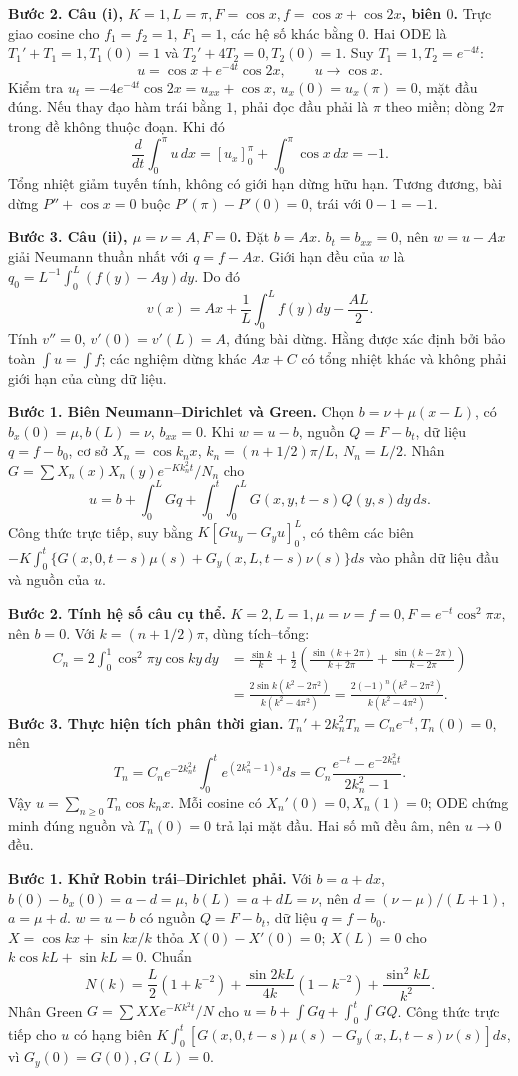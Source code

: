 \textbf{Bước 2. Câu (i), $K=1,L=\pi,F=\cos x,f=\cos x+\cos2x$, biên $0$.}
Trực giao cosine cho $f_1=f_2=1$, $F_1=1$, các hệ số khác bằng $0$. Hai ODE là $T_1'+T_1=1,T_1(0)=1$ và $T_2'+4T_2=0,T_2(0)=1$. Suy $T_1=1,T_2=e^{-4t}$:
\[u=\cos x+e^{-4t}\cos2x,\qquad u\to\cos x.\]
Kiểm tra $u_t=-4e^{-4t}\cos2x=u_{xx}+\cos x$, $u_x(0)=u_x(\pi)=0$, mặt đầu đúng.
Nếu thay đạo hàm trái bằng $1$, phải đọc đầu phải là $\pi$ theo miền; dòng $2\pi$ trong đề không thuộc đoạn. Khi đó
\[\frac d{dt}\int_0^\pi u\,dx=[u_x]_0^\pi+\int_0^\pi\cos x\,dx=-1.\]
Tổng nhiệt giảm tuyến tính, không có giới hạn dừng hữu hạn. Tương đương, bài dừng $P''+\cos x=0$ buộc $P'(\pi)-P'(0)=0$, trái với $0-1=-1$.

\textbf{Bước 3. Câu (ii), $\mu=\nu=A,F=0$.}
Đặt $b=Ax$. $b_t=b_{xx}=0$, nên $w=u-Ax$ giải Neumann thuần nhất với $q=f-Ax$. Giới hạn đều của $w$ là $q_0=L^{-1}\int_0^L(f(y)-Ay)dy$. Do đó
\[v(x)=Ax+\frac1L\int_0^Lf(y)dy-\frac{AL}2.\]
Tính $v''=0$, $v'(0)=v'(L)=A$, đúng bài dừng. Hằng được xác định bởi bảo toàn $\int u=\int f$; các nghiệm dừng khác $Ax+C$ có tổng nhiệt khác và không phải giới hạn của cùng dữ liệu.

\textbf{Bước 1. Biên Neumann–Dirichlet và Green.}
Chọn $b=\nu+\mu(x-L)$, có $b_x(0)=\mu,b(L)=\nu$, $b_{xx}=0$. Khi $w=u-b$, nguồn $Q=F-b_t$, dữ liệu $q=f-b_0$, cơ sở $X_n=\cos k_nx$, $k_n=(n+1/2)\pi/L$, $N_n=L/2$. Nhân $G=\sum X_n(x)X_n(y)e^{-Kk_n^2t}/N_n$ cho
\[u=b+\int_0^LGq+\int_0^t\!\int_0^LG(x,y,t-s)Q(y,s)dy\,ds.\]
Công thức trực tiếp, suy bằng $K[Gu_y-G_yu]_0^L$, có thêm các biên $-K\int_0^t\{G(x,0,t-s)\mu(s)+G_y(x,L,t-s)\nu(s)\}ds$ vào phần dữ liệu đầu và nguồn của $u$.

\textbf{Bước 2. Tính hệ số câu cụ thể.}
$K=2,L=1,\mu=\nu=f=0,F=e^{-t}\cos^2\pi x$, nên $b=0$. Với $k=(n+1/2)\pi$, dùng tích–tổng:
\begin{align*}
C_n=2\int_0^1\cos^2\pi y\cos ky\,dy
&=\frac{\sin k}k+\frac12\left(\frac{\sin(k+2\pi)}{k+2\pi}
+\frac{\sin(k-2\pi)}{k-2\pi}\right)\\
&=\frac{2\sin k(k^2-2\pi^2)}{k(k^2-4\pi^2)}
=\frac{2(-1)^n(k^2-2\pi^2)}{k(k^2-4\pi^2)}.
\end{align*}
\textbf{Bước 3. Thực hiện tích phân thời gian.}
$T_n'+2k_n^2T_n=C_ne^{-t},T_n(0)=0$, nên
\[T_n=C_ne^{-2k_n^2t}\int_0^te^{(2k_n^2-1)s}ds
=C_n\frac{e^{-t}-e^{-2k_n^2t}}{2k_n^2-1}.\]
Vậy $u=\sum_{n\ge0}T_n\cos k_nx$. Mỗi cosine có $X_n'(0)=0,X_n(1)=0$; ODE chứng minh đúng nguồn và $T_n(0)=0$ trả lại mặt đầu. Hai số mũ đều âm, nên $u\to0$ đều.

\textbf{Bước 1. Khử Robin trái–Dirichlet phải.}
Với $b=a+dx$, $b(0)-b_x(0)=a-d=\mu$, $b(L)=a+dL=\nu$, nên $d=(\nu-\mu)/(L+1)$, $a=\mu+d$. $w=u-b$ có nguồn $Q=F-b_t$, dữ liệu $q=f-b_0$.
$X=\cos kx+\sin kx/k$ thỏa $X(0)-X'(0)=0$; $X(L)=0$ cho $k\cos kL+\sin kL=0$. Chuẩn
\[N(k)=\frac L2(1+k^{-2})+\frac{\sin2kL}{4k}(1-k^{-2})+\frac{\sin^2kL}{k^2}.\]
Nhân Green $G=\sum XXe^{-Kk^2t}/N$ cho $u=b+\int Gq+\int_0^t\int GQ$. Công thức trực tiếp cho $u$ có hạng biên $K\int_0^t[G(x,0,t-s)\mu(s)-G_y(x,L,t-s)\nu(s)]ds$, vì $G_y(0)=G(0),G(L)=0$.

